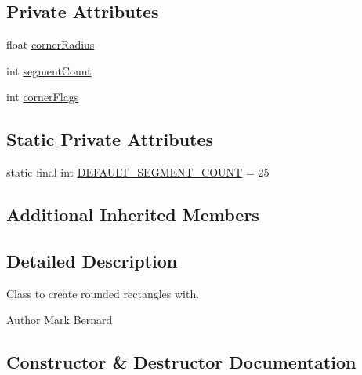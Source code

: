 \subsection*{Private Attributes}
\begin{DoxyCompactItemize}
\item 
float \mbox{\hyperlink{classorg_1_1newdawn_1_1slick_1_1geom_1_1_rounded_rectangle_a3326619644f3ba7e5493f8b191011aa1}{corner\+Radius}}
\item 
int \mbox{\hyperlink{classorg_1_1newdawn_1_1slick_1_1geom_1_1_rounded_rectangle_a581d9cd03fceac25161fe5ce6e574e19}{segment\+Count}}
\item 
int \mbox{\hyperlink{classorg_1_1newdawn_1_1slick_1_1geom_1_1_rounded_rectangle_a3df0f2cafeb30489018956829fbdfa5d}{corner\+Flags}}
\end{DoxyCompactItemize}
\subsection*{Static Private Attributes}
\begin{DoxyCompactItemize}
\item 
static final int \mbox{\hyperlink{classorg_1_1newdawn_1_1slick_1_1geom_1_1_rounded_rectangle_ab921db8719ef692dceb9cfdcb6b6affe}{D\+E\+F\+A\+U\+L\+T\+\_\+\+S\+E\+G\+M\+E\+N\+T\+\_\+\+C\+O\+U\+NT}} = 25
\end{DoxyCompactItemize}
\subsection*{Additional Inherited Members}


\subsection{Detailed Description}
Class to create rounded rectangles with.

\begin{DoxyAuthor}{Author}
Mark Bernard 
\end{DoxyAuthor}


\subsection{Constructor \& Destructor Documentation}
\mbox{\label{classorg_1_1newdawn_1_1slick_1_1geom_1_1_rounded_rectangle_a7c1761ccd0dd9e71d95290b1bd20241e}} 
